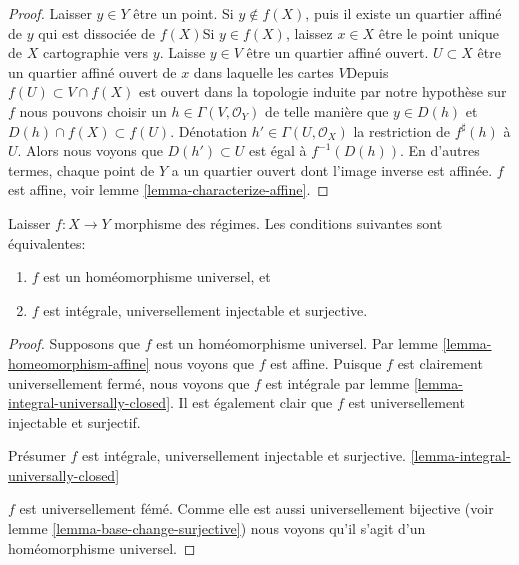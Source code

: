 \begin{proof}

Laisser $y \in Y$ être un point. Si $y \not \in f(X)$, puis il existe un quartier affiné de $y$ qui est dissociée de $f(X)$Si $y \in f(X)$, laissez $x \in X$ être le point unique de $X$ cartographie vers $y$. Laisse $y \in V$ être un quartier affiné ouvert. $U \subset X$ être un quartier affiné ouvert de $x$ dans laquelle les cartes $V$Depuis $f(U) \subset V \cap f(X)$ est ouvert dans la topologie induite par notre hypothèse sur $f$ nous pouvons choisir un
$h \in \Gamma(V, \mathcal{O}_Y)$ de telle manière que $y \in D(h)$
et $D(h) \cap f(X) \subset f(U)$. Dénotation $h' \in \Gamma(U, \mathcal{O}_X)$
la restriction de $f^\sharp(h)$ à $U$. Alors nous voyons que
$D(h') \subset U$ est égal à $f^{-1}(D(h))$. En d'autres termes, chaque point de $Y$ a un quartier ouvert dont l'image inverse est affinée. $f$ est affine, voir lemme \ref{lemma-characterize-affine}.

\end{proof}

\begin{lemma}

\label{lemma-universal-homeomorphism}

Laisser $f : X \to Y$ morphisme des régimes. Les conditions suivantes sont équivalentes:

\begin{enumerate}

\item  $f$ est un homéomorphisme universel, et
\item  $f$ est intégrale, universellement injectable et surjective.

\end{enumerate}

\end{lemma}

\begin{proof}
Supposons que $f$ est un homéomorphisme universel. Par lemme \ref{lemma-homeomorphism-affine} nous voyons que $f$ est affine. Puisque $f$ est clairement universellement fermé, nous voyons que $f$ est intégrale par lemme \ref{lemma-integral-universally-closed}. Il est également clair que $f$ est universellement injectable et surjectif.

\medskip\noindent

Présumer $f$ est intégrale, universellement injectable et surjective. \ref{lemma-integral-universally-closed}

$f$ est universellement fémé. Comme elle est aussi universellement bijective (voir lemme \ref{lemma-base-change-surjective}) nous voyons qu'il s'agit d'un homéomorphisme universel.

\end{proof}

